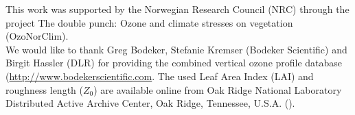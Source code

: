 \documentclass[gmd, manuscript]{copernicus}
\begin{document}








\begin{acknowledgements}
  This work was supported by the Norwegian Research Council (NRC) through the project The double punch: Ozone and climate stresses on vegetation (OzoNorClim).\\
  We would like to thank Greg Bodeker, Stefanie Kremser (Bodeker Scientific) and Birgit Hassler (DLR) for providing the combined vertical ozone profile database (\url{http://www.bodekerscientific.com}.
  The used Leaf Area Index (LAI) and roughness length ($Z_0$) are available online from Oak Ridge National Laboratory Distributed Active Archive Center, Oak Ridge, Tennessee, U.S.A. ().
\end{acknowledgements}










\end{document}

